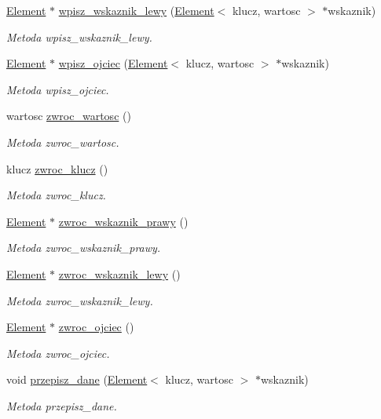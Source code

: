 \begin{DoxyCompactItemize}
\hyperlink{class_element}{Element} $\ast$ \hyperlink{class_element_ab5aaf821a1d95165c9fcfdb98f5c9fca}{wpisz\-\_\-wskaznik\-\_\-lewy} (\hyperlink{class_element}{Element}$<$ klucz, wartosc $>$ $\ast$wskaznik)
\begin{DoxyCompactList}\small\item\em Metoda wpisz\-\_\-wskaznik\-\_\-lewy. \end{DoxyCompactList}\item 
\hyperlink{class_element}{Element} $\ast$ \hyperlink{class_element_ad0356448011befb0780bed348a440153}{wpisz\-\_\-ojciec} (\hyperlink{class_element}{Element}$<$ klucz, wartosc $>$ $\ast$wskaznik)
\begin{DoxyCompactList}\small\item\em Metoda wpisz\-\_\-ojciec. \end{DoxyCompactList}\item 
wartosc \hyperlink{class_element_a5f1d13188101292091170d462cdf2fbd}{zwroc\-\_\-wartosc} ()
\begin{DoxyCompactList}\small\item\em Metoda zwroc\-\_\-wartosc. \end{DoxyCompactList}\item 
klucz \hyperlink{class_element_a4041559698851d33d77d9c457f3a5da4}{zwroc\-\_\-klucz} ()
\begin{DoxyCompactList}\small\item\em Metoda zwroc\-\_\-klucz. \end{DoxyCompactList}\item 
\hyperlink{class_element}{Element} $\ast$ \hyperlink{class_element_a4366a3d51d26cdad6526425c654945dc}{zwroc\-\_\-wskaznik\-\_\-prawy} ()
\begin{DoxyCompactList}\small\item\em Metoda zwroc\-\_\-wskaznik\-\_\-prawy. \end{DoxyCompactList}\item 
\hyperlink{class_element}{Element} $\ast$ \hyperlink{class_element_a557390f4d68e393ecbd4ce9f1706990b}{zwroc\-\_\-wskaznik\-\_\-lewy} ()
\begin{DoxyCompactList}\small\item\em Metoda zwroc\-\_\-wskaznik\-\_\-lewy. \end{DoxyCompactList}\item 
\hyperlink{class_element}{Element} $\ast$ \hyperlink{class_element_ac24b7bfe84763613a838012e85ad4ac4}{zwroc\-\_\-ojciec} ()
\begin{DoxyCompactList}\small\item\em Metoda zwroc\-\_\-ojciec. \end{DoxyCompactList}\item 
void \hyperlink{class_element_aacd6653f0fa6475a8b2e122dddf80627}{przepisz\-\_\-dane} (\hyperlink{class_element}{Element}$<$ klucz, wartosc $>$ $\ast$wskaznik)
\begin{DoxyCompactList}\small\item\em Metoda przepisz\-\_\-dane. \end{DoxyCompactList}\end{DoxyCompactItemize}


